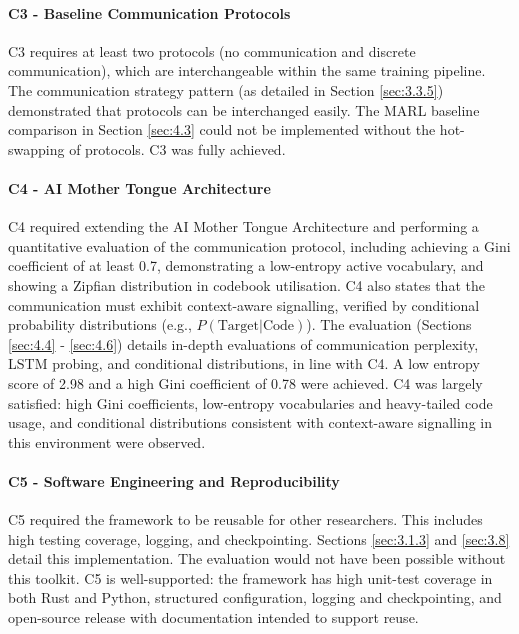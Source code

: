 \paragraph{C3 - Baseline Communication Protocols}
C3 requires at least two protocols (no communication and discrete communication), which are interchangeable within the same training pipeline.
The communication strategy pattern (as detailed in Section \ref{sec:3.3.5}) demonstrated that protocols can be interchanged easily.
The MARL baseline comparison in Section \ref{sec:4.3} could not be implemented without the hot-swapping of protocols.
C3 was fully achieved.

\paragraph{C4 - AI Mother Tongue Architecture}
C4 required extending the AI Mother Tongue Architecture and performing a quantitative evaluation of the communication protocol, including achieving a Gini coefficient of at least 0.7, demonstrating a low-entropy active vocabulary, and showing a Zipfian distribution in codebook utilisation.
C4 also states that the communication must exhibit context-aware signalling, verified by conditional probability distributions (e.g., $P(\text{Target}|\text{Code})$).
The evaluation (Sections \ref{sec:4.4} - \ref{sec:4.6}) details in-depth evaluations of communication perplexity, LSTM probing, and conditional distributions, in line with C4.
A low entropy score of 2.98 and a high Gini coefficient of 0.78 were achieved.
C4 was largely satisfied: high Gini coefficients, low-entropy vocabularies and heavy-tailed code usage, and conditional distributions consistent with context-aware signalling in this environment were observed.

\paragraph{C5 - Software Engineering and Reproducibility}
C5 required the framework to be reusable for other researchers.
This includes high testing coverage, logging, and checkpointing.
Sections \ref{sec:3.1.3} and \ref{sec:3.8} detail this implementation.
The evaluation would not have been possible without this toolkit.
C5 is well-supported: the framework has high unit-test coverage in both Rust and Python, structured configuration, logging and checkpointing, and open-source release with documentation intended to support reuse.